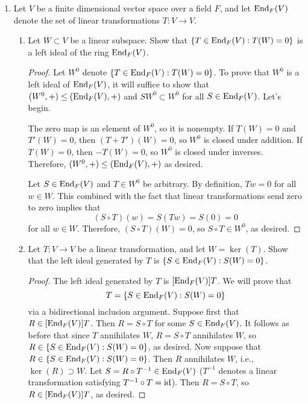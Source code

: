 \documentclass[../psets.tex]{subfiles}
\begin{document}
\begin{enumerate}[resume]
\begin{proof}
    \end{proof}
    \item Let $V$ be a finite dimensional vector space over a field $F$, and let $\operatorname{End}_F(V)$ denote the set of linear transformations $T:V\to V$.
    \begin{enumerate}[label={(\alph*)}]
        \item Let $W\subset V$ be a linear subspace. Show that $\{T\in\operatorname{End}_F(V):T(W)=0\}$ is a left ideal of the ring $\operatorname{End}_F(V)$.
        \begin{proof}
            Let $W^0$ denote $\{T\in\operatorname{End}_F(V):T(W)=0\}$. To prove that $W^0$ is a left ideal of $\operatorname{End}_F(V)$, it will suffice to show that $(W^0,+)\leq(\operatorname{End}_F(V),+)$ and $SW^0\subset W^0$ for all $S\in\operatorname{End}_F(V)$. Let's begin.\par
            The zero map is an element of $W^0$, so it is nonempty. If $T(W)=0$ and $T'(W)=0$, then $(T+T')(W)=0$, so $W^0$ is closed under addition. If $T(W)=0$, then $-T(W)=0$, so $W^0$ is closed under inverses. Therefore, $(W^0,+)\leq(\operatorname{End}_F(V),+)$ as desired.\par
            Let $S\in\operatorname{End}_F(V)$ and $T\in W^0$ be arbitrary. By definition, $Tw=0$ for all $w\in W$. This combined with the fact that linear transformations send zero to zero implies that
            \begin{equation*}
                (S\circ T)(w) = S(Tw)
                = S(0)
                = 0
            \end{equation*}
            for all $w\in W$. Therefore, $(S\circ T)(W)=0$, so $S\circ T\in W^0$, as desired.
        \end{proof}
        \item Let $T:V\to V$ be a linear transformation, and let $W=\ker(T)$. Show that the left ideal generated by $T$ is $\{S\in\operatorname{End}_F(V):S(W)=0\}$.
        \begin{proof}
            The left ideal generated by $T$ is $[\operatorname{End}_F(V)]T$. We will prove that
            \begin{equation*}
                [\End_F(V)]T = \{S\in\End_F(V):S(W)=0\}
            \end{equation*}
            via a bidirectional inclusion argument. Suppose first that $R\in[\operatorname{End}_F(V)]T$. Then $R=S\circ T$ for some $S\in\operatorname{End}_F(V)$. It follows as before that since $T$ annihilates $W$, $R=S\circ T$ annihilates $W$, so $R\in\{S\in\operatorname{End}_F(V):S(W)=0\}$, as desired. Now suppose that $R\in\{S\in\operatorname{End}_F(V):S(W)=0\}$. Then $R$ annihilates $W$, i.e., $\ker(R)\supset W$. Let $S=R\circ T^{-1}\in\operatorname{End}_F(V)$ ($T^{-1}$ denotes a linear transformation satisfying $T^{-1}\circ T=\operatorname{id}$). Then $R=S\circ T$, so $R\in[\operatorname{End}_F(V)]T$, as desired.

\end{proof}
\end{enumerate}
\end{enumerate}
\end{document}

